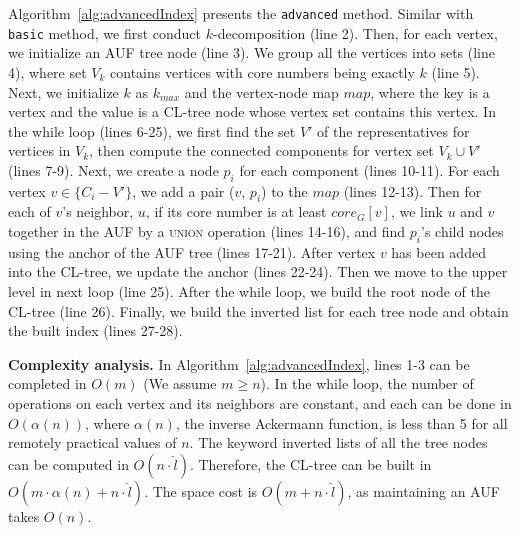 Algorithm~\ref{alg:advancedIndex} presents the {\tt advanced} method.
Similar with {\tt basic} method, we first conduct $k$-decomposition (line 2).
Then, for each vertex, we initialize an AUF tree node (line 3).
We group all the vertices into sets (line 4),
where set $V_k$ contains vertices with core numbers being exactly $k$ (line 5).
Next, we initialize $k$ as $k_{max}$ and the vertex-node map $map$,
where the key is a vertex and the value is a CL-tree node whose vertex set contains this vertex.
In the while loop (lines 6-25),
we first find the set $V'$ of the representatives for vertices in $V_k$,
then compute the connected components for vertex set $V_k\cup V'$ (lines 7-9).
Next, we create a node $p_i$ for each component (lines 10-11).
For each vertex $v\in \{C_i-V'\}$, we add a pair ($v$, $p_i$) to the $map$ (lines 12-13).
Then for each of $v$'s neighbor, $u$, if its core number is at least $core_G[v]$,
we link $u$ and $v$ together in the AUF by a \textsc{union} operation (lines 14-16),
and find $p_i$'s child nodes using the anchor of the AUF tree (lines 17-21).
After vertex $v$ has been added into the CL-tree, we update the anchor (lines 22-24).
Then we move to the upper level in next loop (line 25).
After the while loop, we build the root node of the CL-tree (line 26).
Finally, we build the inverted list for each tree node and obtain the built index (lines 27-28).


\textbf{Complexity analysis.}
In Algorithm~\ref{alg:advancedIndex}, lines 1-3 can be completed in $O(m)$ (We assume $m$$\ge$$n$).
In the while loop, the number of operations on each vertex and its neighbors are constant,
and each can be done in $O(\alpha(n))$, where $\alpha(n)$, the inverse Ackermann function, is less than 5 for all remotely
practical values of $n$.
The keyword inverted lists of all the tree nodes can be computed in $O(n\cdot {\widehat l})$.
Therefore, the CL-tree can be built in $O(m\cdot \alpha(n)+n\cdot{\widehat l})$.
The space cost is $O(m+n\cdot{\widehat l})$, as maintaining an AUF takes $O(n)$.


